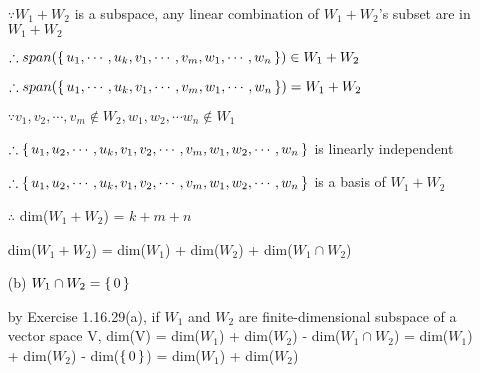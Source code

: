 \begin{tcolorbox}
\begin{solution}
\begin{enumerate}
			$\because W_1 + W_2$ is a subspace, any linear combination of $W_1 + W_2$'s subset are in $W_1 + W_2$
			
			$\therefore span(\left\{ \,u_1,\cdots,u_k,v_1,\cdots,v_m,w_1,\cdots,w_n \,\right\}) \in W_1 + W_2$
			
			$\therefore span(\left\{ \,u_1,\cdots,u_k,v_1,\cdots,v_m,w_1,\cdots,w_n \,\right\}) = W_1 + W_2$
			
			
			$\because v_1,v_2,\cdots,v_m \notin W_2,w_1,w_2,\cdots w_n \notin W_1$
			
			
			$\therefore \left\{ \,u_1,u_2,\cdots,u_k,v_1,v_2,\cdots,v_m,w_1,w_2,\cdots,w_n \,\right\}$ is linearly independent
			
			$\therefore \left\{ \,u_1,u_2,\cdots,u_k,v_1,v_2,\cdots,v_m,w_1,w_2,\cdots,w_n \,\right\}$ is a basis of $W_1 + W_2$
			
			
			
			$\therefore$ dim($W_1 + W_2$) = $k+m+n$
			
			dim($W_1 + W_2$) = dim($W_1$) + dim($W_2$) + dim($W_1 \cap W_2$)
			
			
			\item[(b)] $W_1 \cap W_2 = \left\{ \,0 \,\right\}$
			
			by Exercise 1.16.29(a), if $W_1$ and $W_2$ are finite-dimensional subspace of a vector space V, dim(V) = dim($W_1$) + dim($W_2$) - dim($W_1 \cap W_2$) = dim($W_1$) + dim($W_2$) - dim($\left\{ \,0 \,\right\}$) = dim($W_1$) + dim($W_2$)
			
		\end{enumerate}
	\end{solution}
\end{tcolorbox}